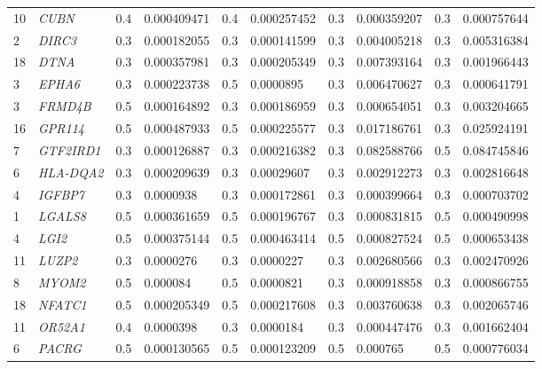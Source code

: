 \begin{refsection}
\begin{otherlanguage}{english}
\begin{scriptsize}
\begin{longtable}{llllllllll}
10 & \cellcolor[HTML]{CBCEFB}\textit{CUBN} & 0.4 & 0.000409471 & 0.4 & 0.000257452 & 0.3 & \cellcolor[HTML]{CBCEFB}0.000359207 & 0.3 & 0.000757644 \\
2 & \cellcolor[HTML]{CBCEFB}\textit{DIRC3} & 0.3 & 0.000182055 & 0.3 & 0.000141599 & 0.3 & 0.004005218 & 0.3 & 0.005316384 \\
18 & \cellcolor[HTML]{CBCEFB}\textit{DTNA} & 0.3 & 0.000357981 & 0.3 & 0.000205349 & 0.3 & 0.007393164 & 0.3 & 0.001966443 \\
3 & \cellcolor[HTML]{CBCEFB}\textit{EPHA6} & 0.3 & 0.000223738 & 0.5 & 0.0000895 & 0.3 & 0.006470627 & 0.3 & 0.000641791 \\
3 & \cellcolor[HTML]{CBCEFB}\textit{FRMD4B} & 0.5 & 0.000164892 & 0.3 & 0.000186959 & 0.3 & 0.000654051 & 0.3 & 0.003204665 \\
16 & \cellcolor[HTML]{CBCEFB}\textit{GPR114} & 0.5 & 0.000487933 & 0.5 & 0.000225577 & 0.3 & 0.017186761 & 0.3 & 0.025924191 \\
7 & \cellcolor[HTML]{CBCEFB}\textit{GTF2IRD1} & 0.3 & 0.000126887 & 0.3 & 0.000216382 & 0.3 & 0.082588766 & 0.5 & 0.084745846 \\
6 & \cellcolor[HTML]{CBCEFB}\textit{HLA-DQA2} & 0.3 & 0.000209639 & 0.3 & 0.00029607 & 0.3 & 0.002912273 & 0.3 & 0.002816648 \\
4 & \cellcolor[HTML]{CBCEFB}\textit{IGFBP7} & 0.3 & 0.0000938 & 0.3 & 0.000172861 & 0.3 & \cellcolor[HTML]{CBCEFB}0.000399664 & 0.3 & 0.000703702 \\
1 & \cellcolor[HTML]{CBCEFB}\textit{LGALS8} & 0.5 & 0.000361659 & 0.5 & 0.000196767 & 0.3 & 0.000831815 & 0.5 & \cellcolor[HTML]{CBCEFB}0.000490998 \\
4 & \cellcolor[HTML]{CBCEFB}\textit{LGI2} & 0.5 & 0.000375144 & 0.5 & 0.000463414 & 0.5 & 0.000827524 & 0.5 & 0.000653438 \\
11 & \cellcolor[HTML]{CBCEFB}\textit{LUZP2} & 0.3 & 0.0000276 & 0.3 & 0.0000227 & 0.3 & 0.002680566 & 0.3 & 0.002470926 \\
8 & \cellcolor[HTML]{CBCEFB}\textit{MYOM2} & 0.5 & 0.000084 & 0.5 & 0.0000821 & 0.3 & 0.000918858 & 0.3 & 0.000866755 \\
18 & \cellcolor[HTML]{CBCEFB}\textit{NFATC1} & 0.5 & 0.000205349 & 0.5 & 0.000217608 & 0.3 & 0.003760638 & 0.3 & 0.002065746 \\
11 & \cellcolor[HTML]{CBCEFB}\textit{OR52A1} & 0.4 & 0.0000398 & 0.3 & 0.0000184 & 0.3 & 0.000447476 & 0.3 & 0.001662404 \\
6 & \cellcolor[HTML]{CBCEFB}\textit{PACRG} & 0.5 & 0.000130565 & 0.5 & 0.000123209 & 0.5 & 0.000765 & 0.5 & 0.000776034 \\

\end{longtable}
\end{scriptsize}
\end{otherlanguage}
\end{refsection}
